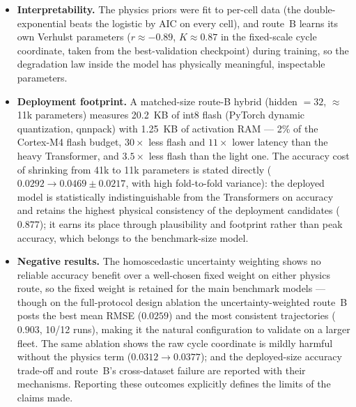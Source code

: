 \begin{itemize}
    long-lived CALCE cell. This negative result has an identified mechanism and
    candidate fixes (coordinate saturation, or the zeroed-coordinate deployment
    path). Under the corrected post-EOL-masked prognostic protocol, the
    non-neural floors and the light Transformer calibrate best on
    $\alpha$-$\lambda$ ($0.44$--$0.49$) and the LSTM leads CRA among the
    learned models ($0.47$); route~B sits mid-pack.
    \item \textbf{Interpretability.} The physics priors were fit to per-cell
    data (the double-exponential beats the logistic by AIC on every cell), and
    route~B learns its own Verhulst parameters ($r\approx-0.89$, $K\approx0.87$
    in the fixed-scale cycle coordinate, taken from the best-validation
    checkpoint) during training, so the degradation law inside the model has
    physically meaningful, inspectable parameters.
    \item \textbf{Deployment footprint.} A matched-size route-B hybrid (hidden
    $=32$, $\approx$11k parameters) measures 20.2~KB of int8 flash (PyTorch
    dynamic quantization, qnnpack) with 1.25~KB of activation RAM --- 2\% of the
    Cortex-M4 flash budget, $30\times$ less flash and $11\times$ lower latency
    than the heavy Transformer, and $3.5\times$ less flash than the light one.
    The accuracy cost of shrinking from 41k to 11k parameters is stated directly
    ($0.0292 \rightarrow 0.0469 \pm 0.0217$, with high fold-to-fold variance):
    the deployed model is statistically indistinguishable from the Transformers
    on accuracy and retains the highest physical consistency of the deployment
    candidates ($0.877$); it earns its place through plausibility and footprint
    rather than peak accuracy, which belongs to the benchmark-size model.
    \item \textbf{Negative results.} The homoscedastic uncertainty weighting
    shows no reliable accuracy benefit over a well-chosen fixed weight on
    either physics route, so the fixed weight is retained for the main
    benchmark models --- though on the full-protocol design ablation the
    uncertainty-weighted route~B posts the best mean RMSE ($0.0259$) and the
    most consistent trajectories ($0.903$, 10/12 runs), making it the natural
    configuration to validate on a larger fleet. The same ablation shows the
    raw cycle coordinate is mildly harmful without the physics term
    ($0.0312 \rightarrow 0.0377$); and the deployed-size accuracy trade-off
    and route~B's cross-dataset failure are reported with their mechanisms.
    Reporting these outcomes explicitly defines the limits of the claims
    made.
\end{itemize}


